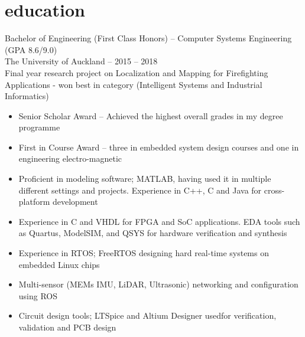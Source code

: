 \documentclass[10pt, a4paper]{article}
\begin{document}
\section{education}
  Bachelor of Engineering (First Class Honors) -- Computer Systems Engineering (GPA 8.6/9.0)\\
  The University of Auckland -- 2015 -- 2018\\
  Final year research project on Localization and Mapping for Firefighting Applications - won best in category (Intelligent Systems and Industrial Informatics)\\
  \begin{itemize}
    \item Senior Scholar Award -- Achieved the highest overall grades in my degree programme
    \item First in Course Award -- three in embedded system design courses and one in engineering electro-magnetic
    \item Proficient in modeling software; MATLAB, having used it in multiple different settings and projects. Experience in C++, C and Java for cross-platform development
    \item Experience in C and VHDL for FPGA and SoC applications. EDA tools such as Quartus, ModelSIM, and QSYS for hardware verification and synthesis
    \item Experience in RTOS; FreeRTOS designing hard real-time systems on embedded Linux chips
    \item Multi-sensor (MEMs IMU, LiDAR, Ultrasonic) networking and configuration using ROS
    \item Circuit design tools; LTSpice and Altium Designer usedfor verification, validation and PCB design
  \end{itemize}
\end{document}
